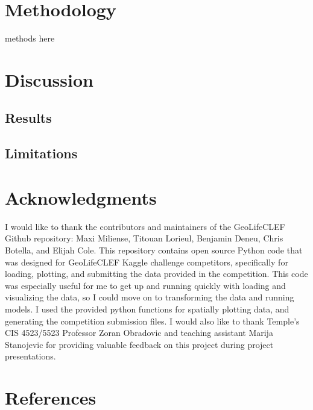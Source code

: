 \documentclass[12pt, oneside]{article}
\begin{document}
\section{Methodology}
\label{Methodology}

\begin{normalsize}

methods here


\end{normalsize}

\section{Discussion}
\label{Discussion}

\begin{normalsize}

\subsection{Results}

\subsection{Limitations}

\end{normalsize}

\section{Acknowledgments}
\label{Acknowledgments}

\begin{normalsize}

I would like to thank the contributors and maintainers of the GeoLifeCLEF Github repository: Maxi Miliense, Titouan Lorieul, Benjamin Deneu, Chris Botella, and Elijah Cole. This repository contains open source Python code that was designed for GeoLifeCLEF Kaggle challenge competitors, specifically for loading, plotting, and submitting the data provided in the competition. This code was especially useful for me to get up and running quickly with loading and visualizing the data, so I could move on to transforming the data and running models. I used the provided python functions for spatially plotting data, and generating the competition submission files. I would also like to thank Temple's CIS 4523/5523 Professor Zoran Obradovic and teaching assistant Marija Stanojevic for providing valuable feedback on this project during project presentations.

\end{normalsize}

\section{References}
\label{References}
\nocite{*}
\printbibliography[heading=none]
\end{document}
